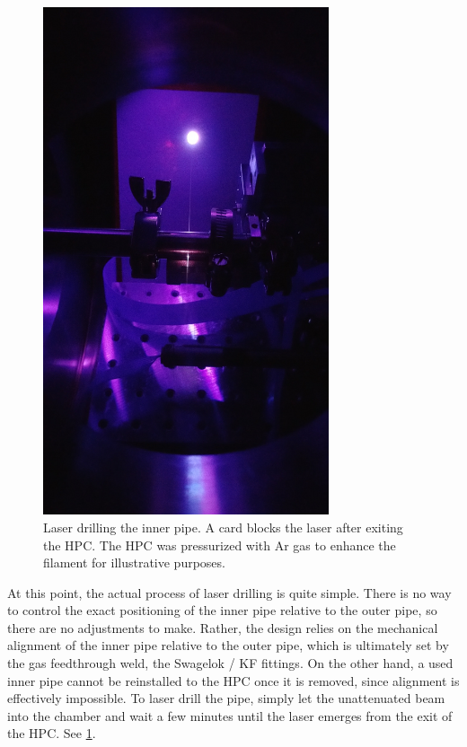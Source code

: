 \begin{figure}
	\centering
	\includegraphics[angle=270, width=0.75\textwidth]{figures/app1/HPC_drilling.jpg}
	\caption{Laser drilling the inner pipe. A card blocks the laser after exiting the HPC. The HPC was pressurized with Ar gas to enhance the filament for illustrative purposes.}
	\label{fig:HPC_drilling}
\end{figure}

At this point, the actual process of laser drilling is quite simple. There is no way to control the exact positioning of the inner pipe relative to the outer pipe, so there are no adjustments to make. Rather, the design relies on the mechanical alignment of the inner pipe relative to the outer pipe, which is ultimately set by the gas feedthrough weld, the Swagelok / KF fittings. On the other hand, a used inner pipe cannot be reinstalled to the HPC once it is removed, since alignment is effectively impossible. To laser drill the pipe, simply let the unattenuated beam into the chamber and wait a few minutes until the laser emerges from the exit of the HPC. See \cref{fig:HPC_drilling}.

